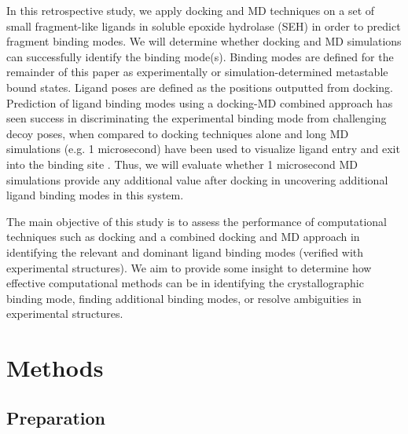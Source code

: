 In this retrospective study, we apply docking and MD techniques on a set of small fragment-like ligands in soluble epoxide hydrolase (SEH) in order to predict fragment binding modes.
We will determine whether docking and MD simulations can successfully identify the binding mode(s).
Binding modes are defined for the remainder of this paper as experimentally or simulation-determined metastable bound states.
Ligand poses are defined as the positions outputted from docking.
Prediction of ligand binding modes using a docking-MD combined approach has seen success in discriminating the experimental binding mode from challenging decoy poses, when compared to docking techniques alone \cite{liu_exploring_2017,clark_prediction_2016} and long MD simulations (e.g. 1 microsecond) have been used to visualize ligand entry and exit into the binding site \cite{decherchi_ligand_2015}.
Thus, we will evaluate whether 1 microsecond MD simulations provide any additional value after docking in uncovering additional ligand binding modes in this system.

The main objective of this study is to assess the performance of computational techniques such as docking and a combined docking and MD approach in identifying the relevant and dominant ligand binding modes (verified with experimental structures).
We aim to provide some insight to determine how effective computational methods can be in identifying the crystallographic binding mode, finding additional binding modes, or resolve ambiguities in experimental structures.

\section{Methods}

\subsection{Preparation}


